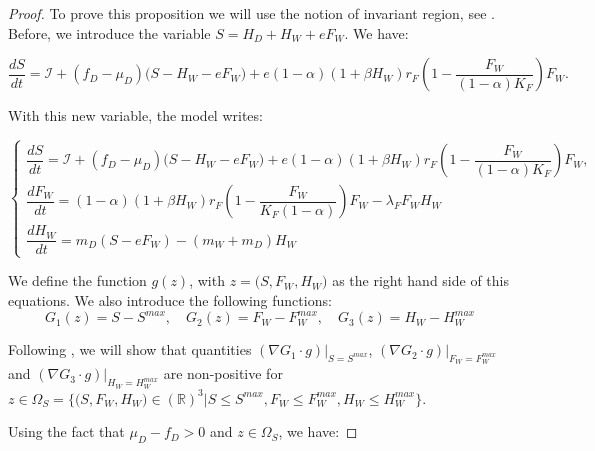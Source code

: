 \documentclass{article}
\newcommand{\lfw}{\lambda_{F}}
\newcommand{\lfw}{\lambda_{F}}
\newcommand{\cI}{\mathcal{I}}
\begin{document}
\begin{proof}
To prove this proposition we will use the notion of invariant region, see \cite{smoller_shock_1994}. Before, we introduce the variable $S = H_D + H_W + e F_W$. We have:

\begin{equation}
\dfrac{dS}{dt} = \cI + (f_D - \mu_D) \Big(S - H_W - eF_W \Big) + e (1-\alpha)(1+\beta H_W)r_F  \left(1 - \dfrac{F_W}{(1-\alpha)K_F} \right) F_W.
\end{equation}

With this new variable, the model writes:

\begin{equation}
\left\{ \begin{array}{l}
\dfrac{dS}{dt} = \cI + (f_D - \mu_D) \Big(S - H_W - e F_W \Big) + e(1-\alpha)(1+\beta H_W) r_F \left(1 - \dfrac{F_W}{(1-\alpha)K_F} \right) F_W, \\
\dfrac{dF_W}{dt} = (1-\alpha)(1+\beta H_W) r_F \left(1 - \dfrac{F_W}{K_F(1-\alpha)} \right) F_W - \lfw F_W H_W \\
\dfrac{dH_W}{dt}= m_D \left(S - eF_W\right) - (m_W + m_D) H_W 
\end{array} \right.
\label{equationsSFWHW}
\end{equation}


We define the function $g(z)$, with $z=\Big(S, F_W, H_W \Big)$ as the right hand side of this equations. We also introduce the following functions:
$$
G_1(z) = S - S^{max},
\quad
G_2(z) = F_W - F_W^{max},
\quad
G_3(z) = H_W - H_W^{max}
$$

Following \cite{smoller_shock_1994}, we will show that quantities $(\nabla G_1 \cdot g)|_{S = S^{max}}$, $(\nabla G_2 \cdot g)|_{F_W = F_W^{max}}$ and $(\nabla G_3 \cdot g)|_{H_W = H_W^{max}}$ are non-positive for $z \in \Omega_S = \Big\{ \Big(S, F_W, H_W \Big) \in (\mathbb{R})^3  \Big|S \leq S^{max}, F_W \leq F_W^{max}, H_W \leq H_W^{max} \Big\}$.

Using the fact that $\mu_D - f_D >0$ and $z\in \Omega_S$, we have:


\end{proof}
\end{document}
